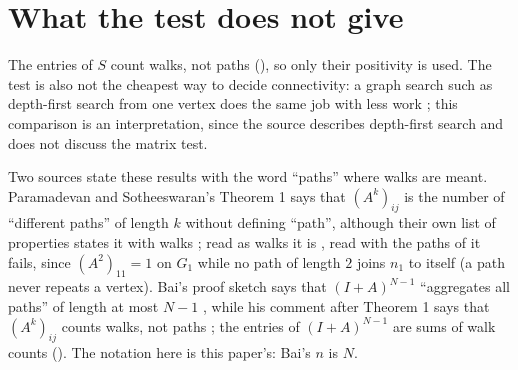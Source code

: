 \section{What the test does not give}\label{sec:limits}

The entries of $S$ count walks, not paths (), so only their positivity is used. The test is also not the cheapest way to decide connectivity: a graph search such as depth-first search from one vertex does the same job with less work \cite{wayne_cos226_undirected}; this comparison is an interpretation, since the source describes depth-first search and does not discuss the matrix test.

Two sources state these results with the word ``paths'' where walks are meant. Paramadevan and Sotheeswaran's Theorem 1 says that $(A^k)_{ij}$ is the number of ``different paths'' of length $k$ \cite[Theorem 1, p.~16]{paramadevan2021adjacency} without defining ``path'', although their own list of properties states it with walks \cite[Section 2.2, item 7, p.~16]{paramadevan2021adjacency}; read as walks it is , read with the paths of  it fails, since $(A^2)_{11} = 1$ on $G_1$ while no path of length $2$ joins $n_1$ to itself (a path never repeats a vertex). Bai's proof sketch says that $(I+A)^{N-1}$ ``aggregates all paths'' of length at most $N-1$ \cite[p.~2]{bai_bimsa_adjacency}, while his comment after Theorem 1 says that $(A^k)_{ij}$ counts walks, not paths \cite[p.~1]{bai_bimsa_adjacency}; the entries of $(I+A)^{N-1}$ are sums of walk counts (). The notation here is this paper's: Bai's $n$ is $N$.
